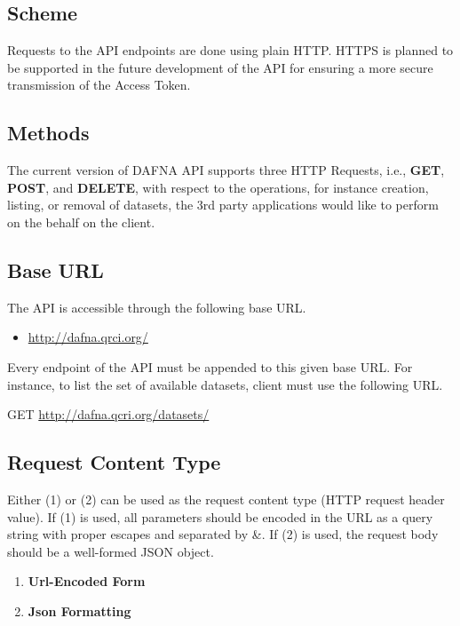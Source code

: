 \documentclass[a4paper,10pt]{scrartcl}
\begin{document}
\subsection{Scheme}
Requests to the API endpoints are done using plain HTTP. HTTPS is planned to be supported 
in the future development of the API for ensuring a more secure transmission of the Access 
Token.
\subsection{Methods}
The current version of DAFNA API supports three HTTP Requests, i.e., \textbf{GET}, \textbf{POST}, and \textbf{DELETE}, 
with respect to the operations, for instance creation, listing, or removal of datasets, the 3rd party applications would
like to perform on the behalf on the client.
\subsection{Base URL}
The API is accessible through the following base URL.
\begin{itemize}
 \item \href{http://dafna.qrci.org/}{http://dafna.qrci.org/}
\end{itemize}
Every endpoint of the API must be appended to this given base URL.
For instance, to list the set of available datasets, client must use 
the following URL.
\begin{description}
\item GET \href{http://dafna.qcri.org/datasets/}{http://dafna.qcri.org/datasets/} 
\end{description}
\subsection{Request Content Type}
Either (1)  or (2)  can be used as the request content type (HTTP request 
header value). If (1) is used, all parameters should be encoded in the URL as a query string with proper escapes and separated by \&. If (2) is used, the request body should 
be a well-formed JSON object. 

\begin{enumerate}
 \item \textbf{Url-Encoded Form}
 \item \textbf{Json Formatting}
\end{enumerate}
\end{document}
